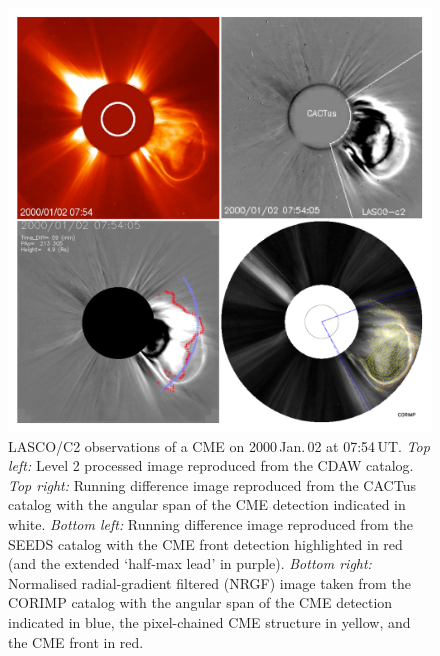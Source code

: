 \documentclass[referee,a4paper,12pt,traditabstract]{swsc}
\begin{document}
\begin{linenumbers}
\begin{figure}[!h]
\centerline{\includegraphics[width=\linewidth]{images/20000102_four.pdf}}
\caption{LASCO/C2 observations of a CME on 2000\,Jan.\,02 at 07:54\,UT. \emph{Top left:} Level 2 processed image reproduced from the CDAW catalog. \emph{Top right:} Running difference image reproduced from the CACTus catalog with the angular span of the CME detection indicated in white. \emph{Bottom left:} Running difference image reproduced from the SEEDS catalog with the CME front detection highlighted in red (and the extended `half-max lead' in purple). \emph{Bottom right:} Normalised radial-gradient filtered (NRGF) image taken from the CORIMP catalog with the angular span of the CME detection indicated in blue, the pixel-chained CME structure in yellow, and the CME front in red.}
\label{20000102_four}
\end{figure}


\end{linenumbers}
\end{document}

